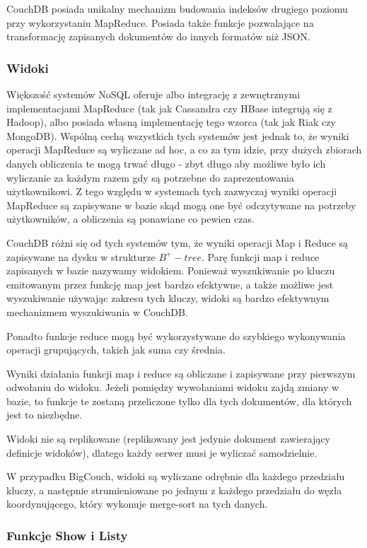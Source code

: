CouchDB posiada unikalny mechanizm budowania indeksów drugiego poziomu przy wykorzystaniu MapReduce.
Posiada także funkcje pozwalające na transformację zapisanych dokumentów do innych formatów niż JSON.

\subsubsection*{Widoki}

Większość systemów NoSQL oferuje albo integrację z zewnętrznymi implementacjami MapReduce (tak jak Cassandra czy HBase integrują się z Hadoop), albo posiada własną implementację tego wzorca (tak jak Riak czy MongoDB).
Wspólną cechą wszystkich tych systemów jest jednak to, że wyniki operacji MapReduce są wyliczane ad hoc, a co za tym idzie, przy dużych zbiorach danych obliczenia te mogą trwać długo - zbyt długo aby możliwe było ich wyliczanie za każdym razem gdy są potrzebne do zaprezentowania użytkownikowi.
Z tego względu w systemach tych zazwyczaj wyniki operacji MapReduce są zapisywane w bazie skąd mogą one być odczytywane na potrzeby użytkowników, a obliczenia są ponawiane co pewien czas.

CouchDB różni się od tych systemów tym, że wyniki operacji Map i Reduce są zapisywane na dysku w strukturze $B^+-tree$.
Parę funkcji map i reduce zapisanych w bazie nazywamy widokiem.
Ponieważ wyszukiwanie po kluczu emitowanym przez funkcję map jest bardzo efektywne, a także możliwe jest wyszukiwanie używając zakresu tych kluczy, widoki są bardzo efektywnym mechanizmem wyszukiwania w CouchDB.

Ponadto funkcje reduce mogą być wykorzystywane do szybkiego wykonywania operacji grupujących, takich jak suma czy średnia.

Wyniki działania funkcji map i reduce są obliczane i zapisywane przy pierwszym odwołaniu do widoku.
Jeżeli pomiędzy wywołaniami widoku zajdą zmiany w bazie, to funkcje te zostaną przeliczone tylko dla tych dokumentów, dla których jest to niezbędne.

Widoki nie są replikowane (replikowany jest jedynie dokument zawierający definicje widoków), dlatego każdy serwer musi je wyliczać samodzielnie.

W przypadku BigCouch, widoki są wyliczane odrębnie dla każdego przedziału kluczy, a następnie strumieniowane po jednym z każdego przedziału do węzła koordynującego, który wykonuje merge-sort na tych danych.

\subsubsection*{Funkcje Show i Listy}


